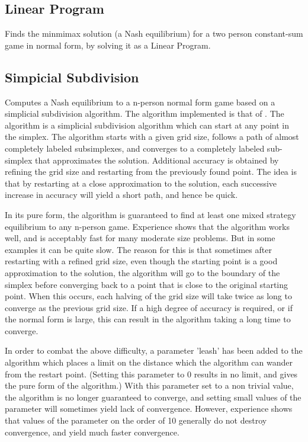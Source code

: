\subsection{Linear Program}

Finds the minmimax solution (a Nash equilibrium) for a two person
constant-sum game in normal form, by solving it as a Linear Program.

\subsection{Simpicial Subdivision}

Computes a Nash equilibrium to a n-person normal form game based on a
simplicial subdivision algorithm.  The algorithm implemented is that
of \cite{VTH:1987}.  The algorithm is a simplicial subdivision
algorithm which can start at any point in the simplex.  The algorithm
starts with a given grid size, follows a path of almost completely
labeled subsimplexes, and converges to a completely labeled
sub-simplex that approximates the solution.  Additional accuracy is
obtained by refining the grid size and restarting from the previously
found point.  The idea is that by restarting at a close approximation
to the solution, each successive increase in accuracy will yield a
short path, and hence be quick.

In its pure form, the algorithm is guaranteed to find at least one
mixed strategy equilibrium to any n-person game.  Experience shows
that the algorithm works well, and is acceptably fast for many
moderate size problems.  But in some examples it can be quite slow.
The reason for this is that sometimes after restarting with a refined
grid size, even though the starting point is a good approximation to
the solution, the algorithm will go to the boundary of the simplex
before converging back to a point that is close to the original
starting point.  When this occurs, each halving of the grid size will
take twice as long to converge as the previous grid size.  If a high
degree of accuracy is required, or if the normal form is large, this
can result in the algorithm taking a long time to converge.

In order to combat the above difficulty, a parameter 'leash' has been
added to the algorithm which places a limit on the distance which the
algorithm can wander from the restart point. (Setting this parameter
to 0 results in no limit, and gives the pure form of the algorithm.)
With this parameter set to a non trivial value, the algorithm is no
longer guaranteed to converge, and setting small values of the
parameter will sometimes yield lack of convergence.  However,
experience shows that values of the parameter on the order of 10
generally do not destroy convergence, and yield much faster
convergence.

